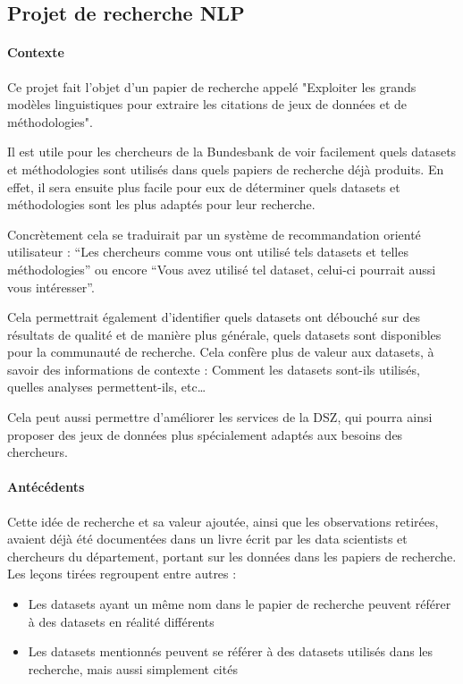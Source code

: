 \pagebreak

\subsection{Projet de recherche NLP}

\paragraph{Contexte}

Ce projet fait l'objet d'un papier de recherche appelé "Exploiter les grands modèles linguistiques pour extraire les citations de jeux de données et de méthodologies".

Il est utile pour les chercheurs de la Bundesbank de voir facilement quels datasets et méthodologies sont utilisés dans quels papiers de recherche déjà produits. 
En effet, il sera ensuite plus facile pour eux de déterminer quels datasets et méthodologies sont les plus adaptés pour leur recherche. 

Concrètement cela se traduirait par un système de recommandation orienté utilisateur : “Les chercheurs comme vous ont utilisé tels datasets et telles méthodologies” ou encore “Vous avez utilisé tel dataset, celui-ci pourrait aussi vous intéresser”. 

Cela permettrait également d'identifier quels datasets ont débouché sur des résultats de qualité et de manière plus générale, quels datasets sont disponibles pour la communauté de recherche.
Cela confère plus de valeur aux datasets, à savoir des informations de contexte : Comment les datasets sont-ils utilisés, quelles analyses permettent-ils, etc… 

Cela peut aussi permettre d'améliorer les services de la DSZ, qui pourra ainsi proposer des jeux de données plus spécialement adaptés aux besoins des chercheurs.


\paragraph{Antécédents}

Cette idée de recherche et sa valeur ajoutée, ainsi que les observations retirées, avaient déjà été documentées dans un livre écrit par les data scientists et chercheurs du département, portant sur les données dans les papiers de recherche.
Les leçons tirées regroupent entre autres : 

\begin{itemize}
    \item Les datasets ayant un même nom dans le papier de recherche peuvent référer à des datasets en réalité différents
    \item Les datasets mentionnés peuvent se référer à des datasets utilisés dans les recherche, mais aussi simplement cités
\end{itemize}

